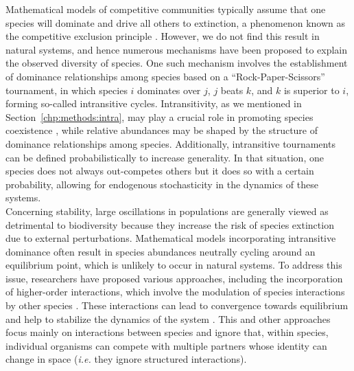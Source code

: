 Mathematical models of competitive communities typically assume that one species will dominate and drive all others to extinction, a phenomenon known as the competitive exclusion principle \cite{hardin1960competitive}. However, we do not find this result in natural systems, and hence numerous mechanisms have been proposed to explain the observed diversity of species.  One such mechanism involves the establishment of dominance relationships among species based on a ``Rock-Paper-Scissors'' tournament, in which species $i$ dominates over $j$, $j$ beats $k$, and $k$ is superior to $i$, forming so-called intransitive cycles. Intransitivity, as we mentioned in Section~\ref{chp:methods:intra}, may play a crucial role in promoting species coexistence \cite{may1975nonlinear,maynard2017diversity}, while relative abundances may be shaped by the structure of dominance relationships among species\cite{Laird2009}. Additionally, intransitive tournaments can be defined probabilistically to increase generality. In that situation, one species does not always out-competes others but it does so with a certain probability, allowing for endogenous stochasticity in the dynamics of these systems.\\

Concerning stability, large oscillations in populations are generally viewed as detrimental to biodiversity because they increase the risk of species extinction due to external perturbations. Mathematical models incorporating intransitive dominance often result in species abundances neutrally cycling around an equilibrium point, which is unlikely to occur in natural systems. To address this issue, researchers have proposed various approaches, including the incorporation of higher-order interactions, which involve the modulation of species interactions by other species \cite{Losapio2019,Levine2017BeyondCommunities}. These interactions can lead to convergence towards equilibrium and help to stabilize the dynamics of the system \cite{Grilli2017Higher-orderModels}. This and other approaches focus mainly on interactions between species and ignore that, within species, individual organisms can compete with multiple partners whose identity can change in space (\textit{i.e.} they ignore structured interactions).\\

